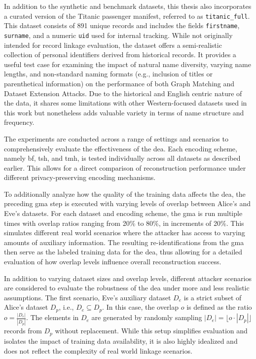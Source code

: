 In addition to the synthetic and benchmark datasets, this thesis also incorporates a curated version of the Titanic passenger manifest, referred to as \texttt{titanic\_full}.
This dataset consists of 891 unique records and includes the fields \texttt{firstname}, \texttt{surname}, and a numeric \texttt{uid} used for internal tracking.
While not originally intended for record linkage evaluation, the dataset offers a semi-realistic collection of personal identifiers derived from historical records.
It provides a useful test case for examining the impact of natural name diversity, varying name lengths, and non-standard naming formats (e.g., inclusion of titles or parenthetical information) on the performance of both Graph Matching and Dataset Extension Attacks.
Due to the historical and English centric nature of the data, it shares some limitations with other Western-focused datasets used in this work but nonetheless adds valuable variety in terms of name structure and frequency.

The experiments are conducted across a range of settings and scenarios to comprehensively evaluate the effectiveness of the \ac{dea}.
Each encoding scheme, namely \ac{bf}, \ac{tsh}, and \ac{tmh}, is tested individually across all datasets as described earlier.
This allows for a direct comparison of reconstruction performance under different privacy-preserving encoding mechanisms.

To additionally analyze how the quality of the training data affects the \ac{dea}, the preceding \ac{gma} step is executed with varying levels of overlap between Alice's and Eve's datasets.
For each dataset and encoding scheme, the \ac{gma} is run multiple times with overlap ratios ranging from 20\% to 80\%, in increments of 20\%.
This simulates different real world scenarios where the attacker has access to varying amounts of auxiliary information.
The resulting re-identifications from the \ac{gma} then serve as the labeled training data for the \ac{dea}, thus allowing for a detailed evaluation of how overlap levels influence overall reconstruction success.

In addition to varying dataset sizes and overlap levels, different attacker scenarios are considered to evaluate the robustness of the \ac{dea} under more and less realistic assumptions.
The first scenario, Eve's auxiliary dataset $D_e$ is a strict subset of Alice's dataset $D_p$, i.e., $D_e \subseteq D_p$.
In this case, the overlap $o$ is defined as the ratio $o = \frac{|D_e|}{|D_p|}$.
The elements in $D_e$ are generated by randomly sampling $|D_e| = \lfloor o \cdot |D_p| \rfloor$ records from $D_p$ without replacement.
While this setup simplifies evaluation and isolates the impact of training data availability, it is also highly idealized and does not reflect the complexity of real world linkage scenarios.

